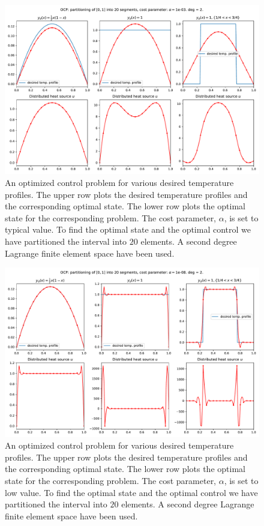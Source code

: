\begin{figure}
  \centering
  \includegraphics[width=\textwidth]{Images/plots/task2_fig_1.pdf}
  \caption{An optimized control problem for various
    desired temperature profiles. The upper row plots the
    desired temperature profiles and the corresponding 
    optimal state. The lower row plots the
    optimal state for the corresponding problem.
    The cost parameter, $\alpha$, is set to typical value.
    To find the optimal state and the optimal control we 
    have partitioned the interval into \( 20 \) elements.
    A second degree Lagrange finite element space have been used.}
  \label{fig:1}
\end{figure}

\begin{figure}
  \centering
  \includegraphics[width=\textwidth]{Images/plots/task2_fig_2.pdf}
  \caption{An optimized control problem for various
    desired temperature profiles. The upper row plots the
    desired temperature profiles and the corresponding 
    optimal state. The lower row plots the
    optimal state for the corresponding problem.
    The cost parameter, $\alpha$, is set to low value.
    To find the optimal state and the optimal control we 
    have partitioned the interval into \( 20 \) elements.
    A second degree Lagrange finite element space have been used.}
  \label{fig:2}
\end{figure}


